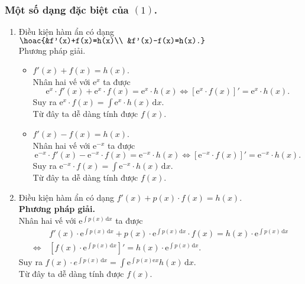 \begin{dang}{~}
	\subsubsection*{Một số dạng đặc biệt của $(1)$.}
	\begin{enumerate}
		\item Điều kiện hàm ẩn có dạng $\hoac{&f'(x)+f(x)=h(x)\\ &f'(x)-f(x)=h(x).}$\\
		      Phương pháp giải.
		      \begin{itemize}
			      \item $f'(x)+f(x)=h(x)$.\\
			            Nhân hai vế với $\mathrm{e}^x$ ta được $$\mathrm{e}^x \cdot f'(x)+\mathrm{e}^x \cdot f(x)=\mathrm{e}^x \cdot h(x) \Leftrightarrow\left[\mathrm{e}^x \cdot f(x)\right]'=\mathrm{e}^x \cdot h(x).$$
			            Suy ra $\mathrm{e}^x \cdot f(x)=\int \mathrm{e}^x \cdot h(x)  \mathrm{\,d} x$.\\
			            Từ đây ta dễ dàng tính được $f(x)$.
			      \item $f'(x)-f(x)=h(x)$.\\
			            Nhân hai vế với $\mathrm{e}^{-x}$ ta được $$\mathrm{e}^{-x} \cdot f'(x)-\mathrm{e}^{-x} \cdot f(x)=\mathrm{e}^{-x} \cdot h(x) \Leftrightarrow\left[\mathrm{e}^{-x} \cdot f(x)\right]'=\mathrm{e}^{-x} \cdot h(x).$$
			            Suy ra $\mathrm{e}^{-x} \cdot f(x)=\int \mathrm{e}^{-x} \cdot h(x)  \mathrm{\,d} x$.\\
			            Từ đây ta dễ dàng tính được $f(x)$.
		      \end{itemize}
		\item Điều kiện hàm ẩn có dạng $f'(x)+p(x)\cdot f(x)=h(x)$.\\
		      \textbf{Phương pháp giải.}\\
		      Nhân hai vế với $\mathrm{e}^{\int\limits p(x) \mathrm{\,d} x}$ ta được
		      \begin{align*}
			                      & \,f'(x) \cdot \mathrm{e}^{\int\limits p(x) \mathrm{\,d} x}+p(x) \cdot \mathrm{e}^{\int\limits p(x) \mathrm{\,d} x} \cdot f(x)=h(x) \cdot \mathrm{e}^{\int\limits p(x) \mathrm{\,d}x} \\
			      \Leftrightarrow & \, \left[f(x) \cdot \mathrm{e}^{\int\limits p(x) \mathrm{\,d} x}\right]'=h(x) \cdot \mathrm{e}^{\int\limits p(x) \mathrm{\,d} x}.
		      \end{align*}
		      Suy ra $f(x) \cdot e^{\int p(x)\mathrm{\,d} x}=\int \mathrm{e}^{\int\limits p(x) \mathrm{e} x} h(x)  \mathrm{\,d} x$.\\
		      Từ đây ta dễ dàng tính được $f(x)$.
	\end{enumerate}
\end{dang}
